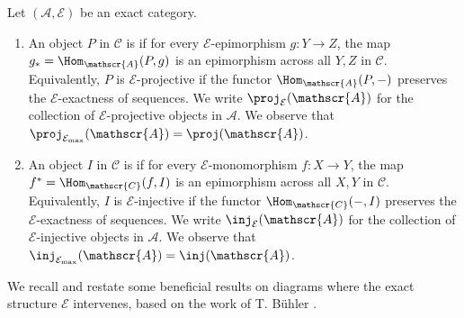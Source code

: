 \begin{definition}\label{def:Eprojectivesinjectives}
Let $(\mathscr{A}, \mathcal{E})$ be an exact category.
\begin{enumerate}[label=$\bullet$,itemsep=1mm]
    \item An object $P$ in $\mathscr{C}$ is  if for every $\mathcal{E}$-epimorphism $g: Y \to Z$, the map $g_* = \Hom_\mathscr{A}(P,g)$ is an epimorphism across all $Y, Z$ in $\mathscr{C}$. Equivalently, $P$ is $\mathcal{E}$-projective if the functor $\Hom_\mathscr{A}(P,-)$ preserves the $\mathcal{E}$-exactness of sequences. We write $\proj_\mathcal{E}(\mathscr{A})$ for the collection of $\mathcal{E}$-projective objects in $\mathscr{A}$. We observe that $\proj_{\mathcal{E}_{\max}}(\mathscr{A}) = \proj(\mathscr{A})$.
    \item An object $I$ in $\mathscr{C}$ is  if for every $\mathcal{E}$-monomorphism $f: X \to Y$, the map $f^* = \Hom_\mathscr{C}(f,I)$ is an epimorphism across all $X, Y$ in $\mathscr{C}$. Equivalently, $I$ is $\mathcal{E}$-injective if the functor $\Hom_\mathscr{C}(-,I)$ preserves the $\mathcal{E}$-exactness of sequences. We write $\inj_{\mathcal{E}}(\mathscr{A})$ for the collection of $\mathcal{E}$-injective objects in $\mathscr{A}$. We observe that $\inj_{\mathcal{E}_{\max}}(\mathscr{A}) = \inj(\mathscr{A})$.
\end{enumerate}
\end{definition}

We recall and restate some beneficial results on diagrams where the exact structure $\mathcal{E}$ intervenes, based on the work of T. Bühler \cite{B10}.

